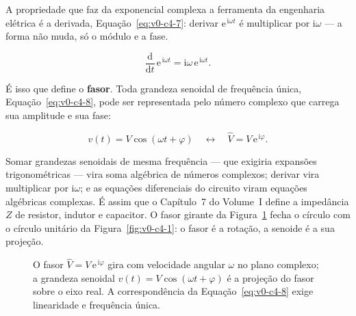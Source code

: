\documentclass[12pt,a4paper]{article}
\numberwithin{equation}{section}
\numberwithin{table}{section}
\numberwithin{figure}{section}
\begin{document}
A propriedade que faz da exponencial complexa a ferramenta da engenharia
elétrica é a derivada, Equação~\eqref{eq:v0-c4-7}: derivar
$\mathrm{e}^{\,\mathrm{i}\omega t}$ é multiplicar por $\mathrm{i}\omega$ ---
a forma não muda, só o módulo e a fase.

\begin{equation}\label{eq:v0-c4-7}
\frac{\mathrm{d}}{\mathrm{d}t}\,\mathrm{e}^{\,\mathrm{i}\omega t}
  = \mathrm{i}\omega\,\mathrm{e}^{\,\mathrm{i}\omega t}.
\end{equation}

É isso que define o \textbf{fasor}. Toda grandeza senoidal de frequência
única, Equação~\eqref{eq:v0-c4-8}, pode ser representada pelo número
complexo que carrega sua amplitude e sua fase:

\begin{equation}\label{eq:v0-c4-8}
v(t) = V\cos(\omega t + \varphi)
\quad\longleftrightarrow\quad
\hat{V} = V\,\mathrm{e}^{\,\mathrm{i}\varphi}.
\end{equation}

Somar grandezas senoidais de mesma frequência --- que exigiria expansões
trigonométricas --- vira soma algébrica de números complexos;
derivar vira multiplicar por $\mathrm{i}\omega$; e as equações diferenciais
do circuito viram equações algébricas complexas. É assim que o Capítulo~7
do Volume~I define a impedância $Z$ de resistor, indutor e capacitor. O
fasor girante da Figura~\ref{fig:v0-c4-2} fecha o círculo com o círculo
unitário da Figura~\ref{fig:v0-c4-1}: o fasor é a rotação, a senoide é a
sua projeção.

\begin{figure}[H]
\centering
{}
\caption[Fasor girante e a senoide como projeção.]{%
O fasor $\hat{V} = V\,\mathrm{e}^{\,\mathrm{i}\varphi}$ gira com velocidade
angular $\omega$ no plano complexo; a grandeza senoidal
$v(t) = V\cos(\omega t + \varphi)$ é a projeção do fasor sobre o eixo real.
A correspondência da Equação~\eqref{eq:v0-c4-8} exige linearidade e
frequência única.}
\label{fig:v0-c4-2}
\end{figure}
\end{document}
